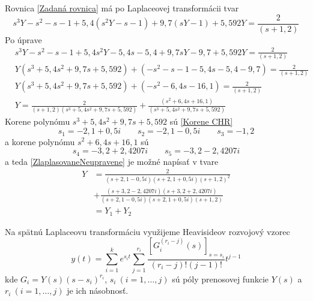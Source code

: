 \documentclass[a4paper, 10pt, ]{article}
\begin{document}
Rovnica \eqref{Zadaná rovnica} má po Laplaceovej transformácii tvar
\begin{equation}
	s^3Y - s^2 - s - 1 + 5,4 \left( s^2Y - s - 1 \right) + 9,7 \left( sY - 1 \right) + 5,592 Y = \frac{2}{\left( s+1,2 \right)}
\end{equation}
Po úprave
\begin{subequations}
	\begin{align}
		& s^3Y - s^2 - s - 1 + 5,4s^2Y - 5,4s - 5,4 + 9,7sY - 9,7 + 5,592 Y = \frac{2}{\left( s+1,2 \right)} \\
		& Y \left( s^3 + 5,4s^2 + 9,7s + 5,592 \right) + \left( - s^2 - s - 1 - 5,4s - 5,4 - 9,7  \right) = \frac{2}{\left( s+1,2 \right)} \\
		& Y \left( s^3 + 5,4s^2 + 9,7s + 5,592 \right) + \left( - s^2 - 6,4s - 16,1 \right) = \frac{2}{\left( s+1,2 \right)} \\
		& Y = \frac{2}{\left( s+1,2 \right) \left( s^3 + 5,4s^2 + 9,7s + 5,592 \right)} + \frac{\left(  s^2 + 6,4s + 16,1 \right)}{ \left( s^3 + 5,4s^2 + 9,7s + 5,592 \right)} \label{ZlaplasovaneNeupravene}
	\end{align}
\end{subequations}
Korene polynómu $s^3 + 5,4s^2 + 9,7s + 5,592$ sú \eqref{Korene CHR}
\begin{equation} \label{Korene CHR}
		s_1 = -2,1 + 0,5i \qquad
		s_2 = -2,1 - 0,5i \qquad
		s_3 = -1,2
\end{equation}
a korene polynómu $s^2 + 6,4s + 16,1$ sú
\begin{equation} \label{Korene citatela vlastnejZ}
		s_4 = -3,2 + 2,4207i \qquad
		s_5 = -3,2 - 2,4207i
\end{equation}
a teda \eqref{ZlaplasovaneNeupravene} je možné napísať v tvare
\begin{equation}
	\begin{split}
		Y &= \frac{2}{\left( s+2,1-0,5i \right)\left( s+2,1+0,5i \right)\left( s+1,2 \right)^2 } \\&+ \frac{\left(  s +3,2 - 2,4207i \right)\left(  s +3,2 + 2,4207i \right)}{ \left( s+2,1-0,5i \right)\left( s+2,1+0,5i \right)\left( s+1,2 \right)} \\
		 & = Y_1 + Y_2
	\end{split}
\end{equation}




Na spätnú Laplaceovu transformáciu využijeme Heavisideov rozvojový vzorec
\begin{equation} \label{Heavisideov rozvojový vzorec}
	y(t) = \sum_{i=1}^k e^{s_i t} \sum_{j=1}^{r_i} \frac{\left[ G_i^{(r_i-j)} (s) \right]_{s = s_i}}{(r_i - j)!(j - 1)!}t^{j-1}
\end{equation}
kde $G_i = Y(s) \left( s - s_i \right)^{r_i}$, $s_i \  (i = 1, \ldots, j)$ sú póly prenosovej funkcie $Y(s)$ a $r_i \  (i = 1, \ldots, j)$ je ich násobnosť.
\end{document}
